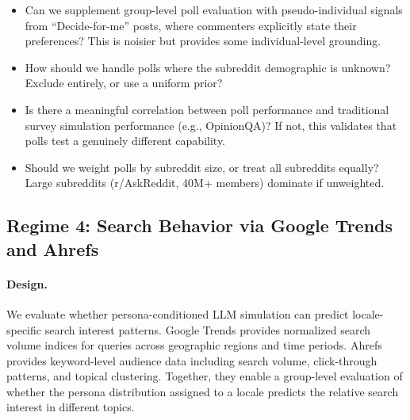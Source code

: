 \begin{itemize}
    \item Can we supplement group-level poll evaluation with pseudo-individual signals from ``Decide-for-me'' posts, where commenters explicitly state their preferences? This is noisier but provides some individual-level grounding.
    \item How should we handle polls where the subreddit demographic is unknown? Exclude entirely, or use a uniform prior?
    \item Is there a meaningful correlation between poll performance and traditional survey simulation performance (e.g., OpinionQA)? If not, this validates that polls test a genuinely different capability.
    \item Should we weight polls by subreddit size, or treat all subreddits equally? Large subreddits (r/AskReddit, 40M+ members) dominate if unweighted.
\end{itemize}


\subsection{Regime 4: Search Behavior via Google Trends and Ahrefs}
\label{sec:eval-search-trends}

\paragraph{Design.}
We evaluate whether persona-conditioned LLM simulation can predict locale-specific search interest patterns.
Google Trends provides normalized search volume indices for queries across geographic regions and time periods.
Ahrefs provides keyword-level audience data including search volume, click-through patterns, and topical clustering.
Together, they enable a group-level evaluation of whether the persona distribution assigned to a locale predicts the relative search interest in different topics.

